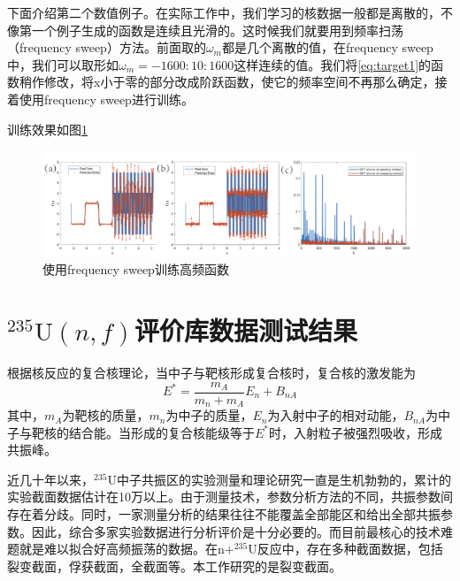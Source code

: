 
下面介绍第二个数值例子。在实际工作中，我们学习的核数据一般都是离散的，不像第一个例子生成的函数是连续且光滑的。这时候我们就要用到频率扫荡（frequency sweep）方法。前面取的$\omega _m$都是几个离散的值，在frequency sweep中，我们可以取形如$\omega _m=-1600:10:1600$这样连续的值。我们将\ref{eq:target1}的函数稍作修改，将x小于零的部分改成阶跃函数，使它的频率空间不再那么确定，接着使用frequency sweep进行训练。

训练效果如图\ref{sweep}
\begin{figure}[htbp!]
  \centering
  \includegraphics[width=0.84\linewidth]{figures/PPSDNN/1D-square.pdf}
  \caption{使用frequency sweep训练高频函数}
  \label{sweep}
\end{figure}


\section{$^{235}\text{U}(n,f)$评价库数据测试结果}
根据核反应的复合核理论，当中子与靶核形成复合核时，复合核的激发能为
\begin{equation}\label{}
  E^{\ast } = \frac{m_A}{m_n+m_A}E_n+B_{nA}
\end{equation}
其中，$m_A$为靶核的质量，$m_n$为中子的质量，$E_n$为入射中子的相对动能，$B_{nA}$为中子与靶核的结合能。当形成的复合核能级等于$E^{\ast }$时，入射粒子被强烈吸收，形成共振峰。

近几十年以来，$^{235}\text{U}$中子共振区的实验测量和理论研究一直是生机勃勃的，累计的实验截面数据估计在10万以上。由于测量技术，参数分析方法的不同，共振参数间存在着分歧。同时，一家测量分析的结果往往不能覆盖全部能区和给出全部共振参数。因此，综合多家实验数据进行分析评价是十分必要的\cite{何锦昌1990中子共振参数的联合拟合分析}。而目前最核心的技术难题就是难以拟合好高频振荡的数据。在$\text{n}+^{235}\text{U}$反应中，存在多种截面数据，包括裂变截面，俘获截面，全截面等。本工作研究的是裂变截面。


